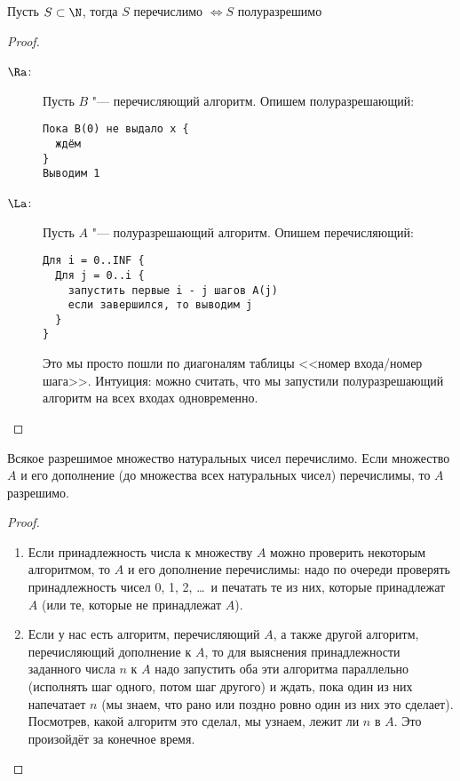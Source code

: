 \begin{theorem}
	Пусть $S \subset \N$, тогда $S$ перечислимо $\iff S$ полуразрешимо
\end{theorem}
\begin{proof}
	\begin{description}
	\item[$\Ra$:]
		Пусть $B$ "--- перечисляющий алгоритм.
		Опишем полуразрешающий:
\begin{verbatim}
Пока B(0) не выдало x {
  ждём
}
Выводим 1
\end{verbatim}
	\item[$\La$:]
		Пусть $A$ "--- полуразрешающий алгоритм.
		Опишем перечисляющий:
\begin{verbatim}
Для i = 0..INF {
  Для j = 0..i {
    запустить первые i - j шагов A(j)
    если завершился, то выводим j
  }
}
\end{verbatim}
		Это мы просто пошли по диагоналям таблицы <<номер входа/номер шага>>.
		Интуиция: можно считать, что мы запустили полуразрешающий алгоритм на всех входах одновременно.
	\end{description}
\end{proof}

\begin{theorem}[Поста]
	Всякое разрешимое множество натуральных чисел перечислимо.
	Если множество $A$ и его дополнение (до множества всех натуральных чисел) перечислимы, то $A$ разрешимо.
\end{theorem}
\begin{proof}
	\begin{enumerate}
	\item
		Если принадлежность числа к множеству $A$ можно проверить некоторым алгоритмом, то $A$ и его дополнение перечислимы:
		надо по очереди проверять принадлежность чисел 0, 1, 2, \dots~и печатать те из них, которые принадлежат $A$ (или те, которые не принадлежат $A$).
	\item
		Если у нас есть алгоритм, перечисляющий $A$, а также другой алгоритм, перечисляющий дополнение к $A$, то для выяснения принадлежности заданного числа $n$
		к $A$ надо запустить оба эти алгоритма параллельно (исполнять шаг одного, потом шаг другого) и ждать, пока один из них напечатает $n$ (мы знаем, что рано или поздно ровно один из них это сделает).
		Посмотрев, какой алгоритм это сделал, мы узнаем, лежит ли $n$ в $A$.
		Это произойдёт за конечное время.
	\end{enumerate}
\end{proof}


